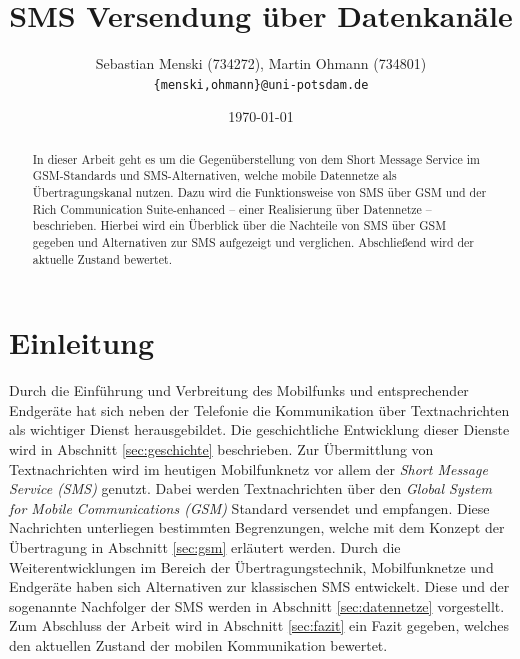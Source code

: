 \documentclass[german,12pt,a4paper]{article}
\begin{document}
\title{\textbf{SMS Versendung über Datenkanäle}}
\author{Sebastian Menski (734272), Martin Ohmann (734801) \\ \texttt{\{menski,ohmann\}@uni-potsdam.de}}
\date{\today}

\maketitle

\begin{abstract}
In dieser Arbeit geht es um die Gegenüberstellung von dem Short Message Service im
GSM-Standards und SMS-Alternativen, welche mobile Datennetze als Übertragungskanal
nutzen. Dazu wird die Funktionsweise von SMS über GSM und der Rich Communication Suite-enhanced
-- einer Realisierung über Datennetze -- beschrieben. Hierbei wird ein Überblick über die Nachteile
von SMS über GSM gegeben und Alternativen zur SMS aufgezeigt und verglichen. Abschließend
wird der aktuelle Zustand bewertet.
\end{abstract}

\section{Einleitung}

Durch die Einführung und Verbreitung des Mobilfunks und entsprechender Endgeräte hat sich neben der
Telefonie die Kommunikation über Textnachrichten als wichtiger Dienst herausgebildet. Die
geschichtliche Entwicklung dieser Dienste wird in Abschnitt \ref{sec:geschichte} beschrieben. Zur
Übermittlung von Textnachrichten wird im heutigen Mobilfunknetz vor allem der \textit{Short
Message Service (SMS)} genutzt. Dabei werden Textnachrichten über den \textit{Global System for
Mobile Communications (GSM)} Standard versendet und empfangen. Diese Nachrichten unterliegen
bestimmten Begrenzungen, welche mit dem Konzept der Übertragung in Abschnitt
\ref{sec:gsm} erläutert werden. Durch die Weiterentwicklungen im Bereich der Übertragungstechnik,
Mobilfunknetze und Endgeräte haben sich Alternativen zur klassischen SMS entwickelt. Diese und der
sogenannte \glqq{}Nachfolger der SMS\grqq{} werden in Abschnitt \ref{sec:datennetze} vorgestellt.
Zum Abschluss der Arbeit wird in Abschnitt \ref{sec:fazit} ein Fazit gegeben, welches den aktuellen
Zustand der mobilen Kommunikation bewertet.
\end{document}
